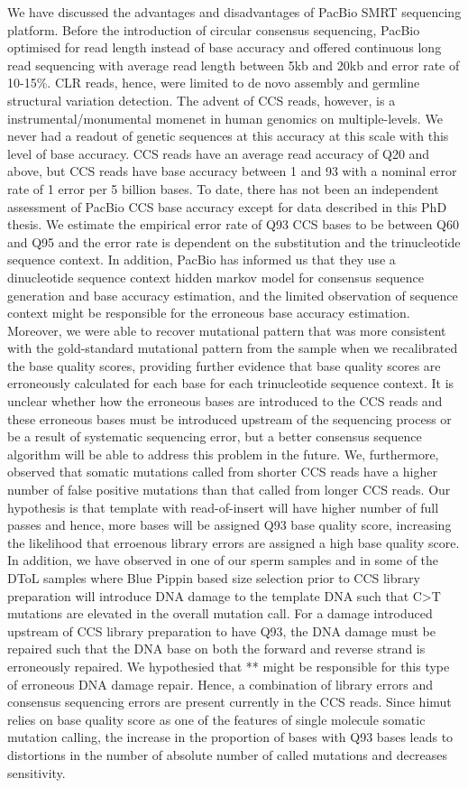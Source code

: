 We have discussed the advantages and disadvantages of PacBio SMRT sequencing platform. Before the introduction of circular consensus sequencing, PacBio optimised for read length instead of base accuracy and offered continuous long read sequencing with average read length between 5kb and 20kb and error rate of 10-15\%. CLR reads, hence, were limited to de novo assembly and germline structural variation detection. The advent of CCS reads, however, is a instrumental/monumental momenet in human genomics on multiple-levels. We never had a readout of genetic sequences at this accuracy at this scale with this level of base accuracy. CCS reads have an average read accuracy of Q20 and above, but CCS reads have base accuracy between 1 and 93 with a nominal error rate of 1 error per 5 billion bases. To date, there has not been an independent assessment of PacBio CCS base accuracy except for data described in this PhD thesis. We estimate the empirical error rate of Q93 CCS bases to be between Q60 and Q95 and the error rate is dependent on the substitution and the trinucleotide sequence context. In addition, PacBio has informed us that they use a dinucleotide sequence context hidden markov model for consensus sequence generation and base accuracy estimation, and the limited observation of sequence context might be responsible for the erroneous base accuracy estimation. Moreover, we were able to recover mutational pattern that was more consistent with the gold-standard mutational pattern from the sample when we recalibrated the base quality scores, providing further evidence that base quality scores are erroneously calculated for each base for each trinucleotide sequence context. It is unclear whether how the erroneous bases are introduced to the CCS reads and these erroneous bases must be introduced upstream of the sequencing process or be a result of systematic sequencing error, but a better consensus sequence algorithm will be able to address this problem in the future. We, furthermore, observed that somatic mutations called from shorter CCS reads have a higher number of false positive mutations than that called from longer CCS reads. Our hypothesis is that template with read-of-insert will have higher number of full passes and hence, more bases will be assigned Q93 base quality score, increasing the likelihood that erroenous library errors are assigned a high base quality score. In addition, we have observed in one of our sperm samples and in some of the DToL samples where Blue Pippin based size selection prior to CCS library preparation will introduce DNA damage to the template DNA such that C>T mutations are elevated in the overall mutation call. For a damage introduced upstream of CCS library preparation to have Q93, the DNA damage must be repaired such that the DNA base on both the forward and reverse strand is erroneously repaired. We hypothesied that ** might be responsible for this type of erroneous DNA damage repair.  Hence, a combination of library errors and consensus sequencing errors are present currently in the CCS reads. Since himut relies on base quality score as one of the features of single molecule somatic mutation calling, the increase in the proportion of bases with Q93 bases leads to distortions in the number of absolute number of called mutations and decreases sensitivity.

